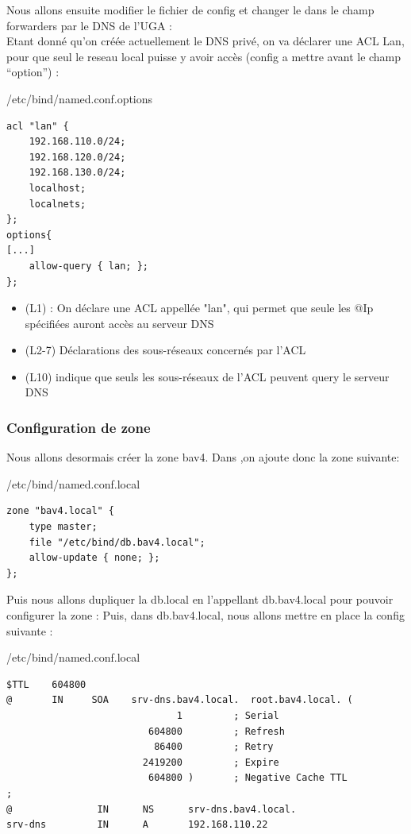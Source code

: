 \documentclass{article}
\begin{document}
Nous allons ensuite modifier le fichier de config 
et changer le  dans le champ forwarders par le DNS de l'UGA : \\
Etant donné qu'on créée actuellement le DNS privé, on va déclarer une ACL Lan, pour que seul le reseau local puisse y avoir accès (config a mettre avant le champ “option”) :
\begin{configbox}{/etc/bind/named.conf.options}
\begin{lstlisting}
acl "lan" {
	192.168.110.0/24;
	192.168.120.0/24;
	192.168.130.0/24;
	localhost;
	localnets;
};
options{ 
[...] 
	allow-query { lan; }; 
};
\end{lstlisting}
\end{configbox}

\begin{itemize}
	\item (L1)  : On déclare une ACL appellée "lan", qui permet que seule les @Ip spécifiées auront accès au serveur DNS
	\item (L2-7) Déclarations des sous-réseaux concernés par l'ACL
	\item (L10)  indique que seuls les sous-réseaux de l'ACL peuvent query le serveur DNS
\end{itemize}

\subsubsection{Configuration de zone} 
Nous allons desormais créer la zone bav4. Dans  ,on ajoute donc la zone suivante:

\begin{configbox}{/etc/bind/named.conf.local}
\begin{lstlisting}
zone "bav4.local" {
    type master;
    file "/etc/bind/db.bav4.local";
    allow-update { none; };
};
\end{lstlisting}
\end{configbox}
Puis nous allons dupliquer la db.local en l’appellant db.bav4.local pour pouvoir configurer la zone : 
Puis, dans db.bav4.local, nous allons mettre en place la config suivante :
\label{subsubsec:confzonedns}
\begin{configbox}{/etc/bind/named.conf.local}
\begin{lstlisting}
$TTL    604800
@       IN     SOA    srv-dns.bav4.local.  root.bav4.local. (
                              1         ; Serial
                         604800         ; Refresh
                          86400         ; Retry
                        2419200         ; Expire
                         604800 )       ; Negative Cache TTL
;
@               IN      NS      srv-dns.bav4.local.
srv-dns         IN      A       192.168.110.22
\end{lstlisting}
\end{configbox}
\end{document}
